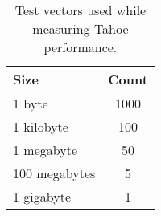 \begin{table}[h]
  \centering
  \begin{tabular}{ | l | c | }
    \hline
    \textbf{Size} & \textbf{Count} \\ \hline
    1 byte & 1000 \\ \hline
    1 kilobyte & 100 \\ \hline
    1 megabyte & 50 \\ \hline
    100 megabytes & 5 \\ \hline
    1 gigabyte & 1 \\ \hline
  \end{tabular}
  \caption{Test vectors used while measuring Tahoe performance.}
  \label{tbl:test_vectors}
\end{table}
